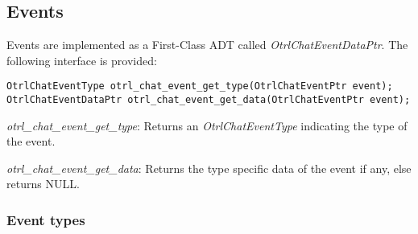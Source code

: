 \subsection{Events}
\label{section:events}
Events are implemented as a First-Class ADT called \emph{OtrlChatEventDataPtr}. The following interface is provided:
\begin{lstlisting}[caption={OtrlChatEventDataPtr First-Class ADT interface}]
OtrlChatEventType otrl_chat_event_get_type(OtrlChatEventPtr event);
OtrlChatEventDataPtr otrl_chat_event_get_data(OtrlChatEventPtr event);
\end{lstlisting}

\begin{description}
  \item \emph{otrl\_chat\_event\_get\_type}: Returns an \emph{OtrlChatEventType} indicating the type of the event.
  
  \item \emph{otrl\_chat\_event\_get\_data}: Returns the type specific data of the event if any, else returns NULL.
    
\end{description}

\subsubsection{Event types}

